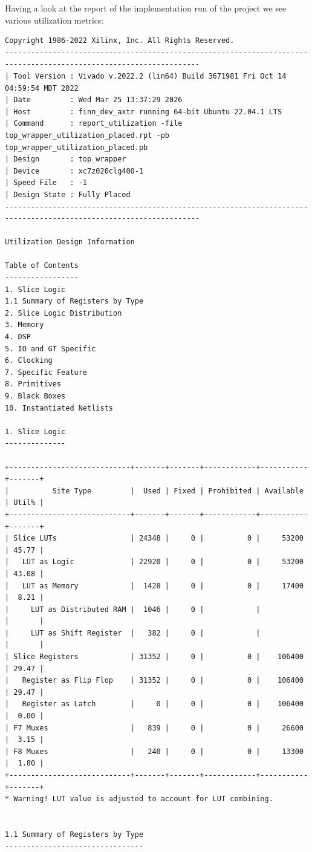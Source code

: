 \documentclass[11pt]{article}
\begin{document}
Having a look at the report of the implementation run of the project we see various utilization metrics:
{\small
\begin{verbatim}
Copyright 1986-2022 Xilinx, Inc. All Rights Reserved.
-------------------------------------------------------------------------------------------------------------------
| Tool Version : Vivado v.2022.2 (lin64) Build 3671981 Fri Oct 14 04:59:54 MDT 2022
| Date         : Wed Mar 25 13:37:29 2026
| Host         : finn_dev_axtr running 64-bit Ubuntu 22.04.1 LTS
| Command      : report_utilization -file top_wrapper_utilization_placed.rpt -pb top_wrapper_utilization_placed.pb
| Design       : top_wrapper
| Device       : xc7z020clg400-1
| Speed File   : -1
| Design State : Fully Placed
-------------------------------------------------------------------------------------------------------------------

Utilization Design Information

Table of Contents
-----------------
1. Slice Logic
1.1 Summary of Registers by Type
2. Slice Logic Distribution
3. Memory
4. DSP
5. IO and GT Specific
6. Clocking
7. Specific Feature
8. Primitives
9. Black Boxes
10. Instantiated Netlists

1. Slice Logic
--------------

+----------------------------+-------+-------+------------+-----------+-------+
|          Site Type         |  Used | Fixed | Prohibited | Available | Util% |
+----------------------------+-------+-------+------------+-----------+-------+
| Slice LUTs                 | 24348 |     0 |          0 |     53200 | 45.77 |
|   LUT as Logic             | 22920 |     0 |          0 |     53200 | 43.08 |
|   LUT as Memory            |  1428 |     0 |          0 |     17400 |  8.21 |
|     LUT as Distributed RAM |  1046 |     0 |            |           |       |
|     LUT as Shift Register  |   382 |     0 |            |           |       |
| Slice Registers            | 31352 |     0 |          0 |    106400 | 29.47 |
|   Register as Flip Flop    | 31352 |     0 |          0 |    106400 | 29.47 |
|   Register as Latch        |     0 |     0 |          0 |    106400 |  0.00 |
| F7 Muxes                   |   839 |     0 |          0 |     26600 |  3.15 |
| F8 Muxes                   |   240 |     0 |          0 |     13300 |  1.80 |
+----------------------------+-------+-------+------------+-----------+-------+
* Warning! LUT value is adjusted to account for LUT combining.


1.1 Summary of Registers by Type
--------------------------------


\end{verbatim}}
\end{document}

